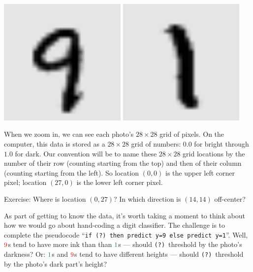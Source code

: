 \documentclass[11pt, justified]{tufte-book}
\newcommand{\attn}[1]{{\bro \textsf{#1}}}
\newcommand{\plainfootprint}{}
\newcommand{\footprint}{\marginnote{\plainfootprint} }
\theoremstyle{definition}
\begin{document}
        \begin{marginfigure}
          \vspace{-3.5cm}
          \includegraphics[width=0.47\textwidth]{example-mnist/mnist-trn-00}%
            \hspace{0.03\textwidth}
          \includegraphics[width=0.47\textwidth]{example-mnist/mnist-trn-01}%
        \end{marginfigure}
        When we zoom in, we can see each photo's $28\times 28$ grid of pixels.
        On the computer, this data is stored as a $28\times 28$ grid of numbers:
        $0.0$ for bright through $1.0$ for dark.
        Our convention will be to name these $28\times28$ grid locations by the
        number of their row (counting starting from the top) and then of their
        column (counting starting from the left).  So location $(0,0)$ is the
        upper left corner pixel; location $(27,0)$ is the lower left corner
        pixel.
        \par\noindent
        \attn{Exercise:} {Where is location $(0,27)$?  %
        In which direction is $(14,14)$ off-center?}

        \footprint
        As part of getting to know the data, it's worth taking a moment to
        think about how we would go about hand-coding a digit classifier.  The
        challenge is to complete the pseudocode
        ``\texttt{if (?)\ then predict y=9 else predict y=1}''.
        Well, ${\red{9}}$s tend to have more ink than than ${\cya{1}}$s ---
        should \texttt{(?)}\ threshold by the photo's darkness?
        Or: ${\cya{1}}$s and ${\red{9}}$s tend to have different heights ---
        should \texttt{(?)}\ threshold by the photo's dark part's height?
\end{document}
